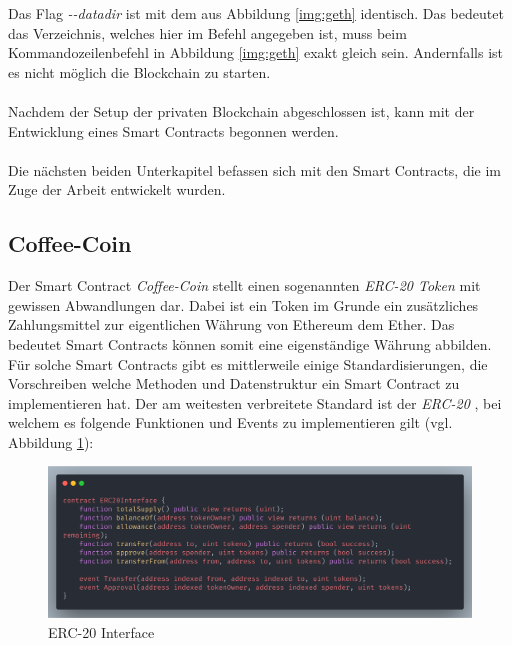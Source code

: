 
Das Flag \textit{-{}-datadir} ist mit dem aus Abbildung \ref{img:geth} identisch. Das bedeutet das Verzeichnis, welches hier im Befehl angegeben ist, muss beim Kommandozeilenbefehl in Abbildung \ref{img:geth} exakt gleich sein. Andernfalls ist es nicht möglich die Blockchain zu starten.\\\\
Nachdem der Setup der privaten Blockchain abgeschlossen ist, kann mit der Entwicklung eines Smart Contracts begonnen werden.\cite{Eth:Guide} \\\\
Die nächsten beiden Unterkapitel befassen sich mit den Smart Contracts, die im Zuge der Arbeit entwickelt wurden.

\subsection{Coffee-Coin}
\label{subsec:cc}
Der Smart Contract \textit{Coffee-Coin} stellt einen sogenannten \textit{ERC-20 Token} mit gewissen Abwandlungen dar. Dabei ist ein Token im Grunde ein zusätzliches Zahlungsmittel zur eigentlichen Währung von Ethereum dem Ether. Das bedeutet Smart Contracts können somit eine eigenständige Währung abbilden. Für solche Smart Contracts gibt es mittlerweile einige Standardisierungen, die Vorschreiben welche Methoden und Datenstruktur ein Smart Contract zu implementieren hat. Der am weitesten verbreitete Standard ist der \textit{ERC-20} \cite{ERC:Wiki, ERC:Github, ERC:BlockGeeks}, bei welchem es folgende Funktionen und Events zu implementieren gilt (vgl. Abbildung \ref{img:ERC}):

\begin{figure}[th!]
	\centering
	\includegraphics[width=.9\columnwidth]{./Abbildungen/Kapitel_03/erc20.png}
	\caption{ERC-20 Interface}
	\label{img:ERC}
\end{figure}

